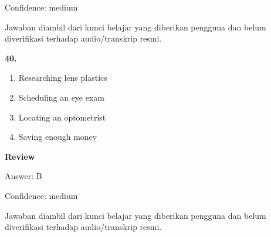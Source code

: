 \documentclass[12pt]{article}
\begin{document}
Confidence: medium\par
Jawaban diambil dari kunci belajar yang diberikan pengguna dan belum diverifikasi terhadap audio/transkrip resmi.\par
\endgroup
\par
\vspace{0.25\baselineskip}
\noindent\textbf{40.}
\begin{enumerate}[label=(\Alph*),leftmargin=*,itemsep=0.2em]
\item Researching lens plastics
\item Scheduling an eye exam
\item Locating an optometrist
\item Saving enough money
\end{enumerate}
\par
\begingroup
\setlength{\parskip}{0pt}
\setlength{\parindent}{0pt}
\textbf{Review}\par
Answer: B\par
Confidence: medium\par
Jawaban diambil dari kunci belajar yang diberikan pengguna dan belum diverifikasi terhadap audio/transkrip resmi.\par
\endgroup
\par
\vspace{0.25\baselineskip}
\end{document}
